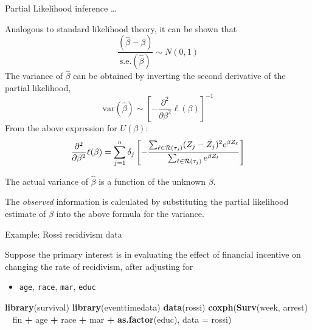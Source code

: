 \documentclass[ignorenonframetext,]{beamer}
\newenvironment{Shaded}{\begin{snugshade}}{\end{snugshade}}
\newcommand{\DataTypeTok}[1]{\textcolor[rgb]{0.13,0.29,0.53}{#1}}
\newcommand{\KeywordTok}[1]{\textcolor[rgb]{0.13,0.29,0.53}{\textbf{#1}}}
\newcommand{\NormalTok}[1]{#1}
\newcommand{\OperatorTok}[1]{\textcolor[rgb]{0.81,0.36,0.00}{\textbf{#1}}}
\newcommand{\StringTok}[1]{\textcolor[rgb]{0.31,0.60,0.02}{#1}}
\providecommand{\tightlist}{%
  \setlength{\itemsep}{0pt}\setlength{\parskip}{0pt}}
\begin{document}
\begin{frame}{%
\protect\hypertarget{partial-likelihood-inference-2}{%
Partial Likelihood inference \ldots}}

Analogous to standard likelihood theory, it can be shown that
\[   \frac{(\widehat{\beta}-\beta)}{\text{s.e.}(\hat{\beta})} \sim N(0,1) \]
The variance of \(\widehat{\beta}\) can be obtained by inverting the
second derivative of the partial likelihood,
\[   \text{var}(\widehat{\beta}) \sim \left[
     -\frac{\partial^2}{\partial \beta^2} \ell(\beta)\right]^{-1}   \]
From the above expression for \(U(\beta)\): \[  
\frac{\partial^2}{\partial \beta^2} \ell(\beta) = 
 \sum_{j=1}^{n}   \delta_j \left[     -  
      \frac{ \sum_{\ell \in {\cal R}(\tau_j)}  (   Z_j  -  \bar{Z}_j  )^2
        e^{\beta  Z_\ell} }
          { \sum_{\ell \in {\cal R}(\tau_j)}  e^{\beta  Z_\ell} } \right]
\]

The actual variance of \(\widehat\beta\) is a function of the unknown
\(\beta\).

The \emph{observed} information is calculated by substituting the
partial likelihood estimate of \(\beta\) into the above formula for the
variance.

\end{frame}

\begin{frame}[fragile]{%
\protect\hypertarget{example-rossi-recidivism-data-2}{%
Example: Rossi recidivism data}}

Suppose the primary interest is in evaluating the effect of financial
incentive on changing the rate of recidivism, after adjusting for

\begin{itemize}
\tightlist
\item
  \texttt{age}, \texttt{race}, \texttt{mar}, \texttt{educ}
\end{itemize}

\small

\begin{Shaded}
\begin{Highlighting}[]
\KeywordTok{library}\NormalTok{(survival)}
\KeywordTok{library}\NormalTok{(eventtimedata)}
\KeywordTok{data}\NormalTok{(rossi)}
\KeywordTok{coxph}\NormalTok{(}\KeywordTok{Surv}\NormalTok{(week, arrest) }\OperatorTok{~}\StringTok{ }\NormalTok{fin }\OperatorTok{+}\StringTok{ }\NormalTok{age }\OperatorTok{+}\StringTok{ }\NormalTok{race }\OperatorTok{+}\StringTok{ }\NormalTok{mar }
      \OperatorTok{+}\StringTok{ }\KeywordTok{as.factor}\NormalTok{(educ), }\DataTypeTok{data =}\NormalTok{ rossi)}
\end{Highlighting}
\end{Shaded}

\normalsize

\end{frame}
\end{document}
